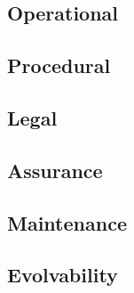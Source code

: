 \subsection{Operational}
\lipsum[13]

\subsection{Procedural}
\lipsum[14]

\subsection{Legal}
\lipsum[15]

\subsection{Assurance}
\lipsum[16]

\subsection{Maintenance}
\lipsum[17]

\subsection{Evolvability}
\lipsum[18]
